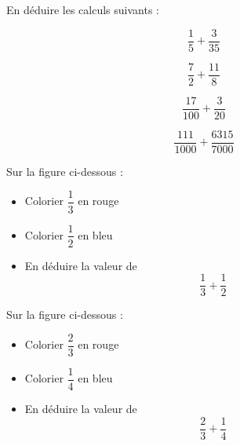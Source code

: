 En déduire les calculs suivants :

\begin{multicols}{4}
    $$\dfrac{1}{5}+\dfrac{3}{35}$$

    $$\dfrac{7}{2}+\dfrac{11}{8}$$

    $$\dfrac{17}{100}+\dfrac{3}{20}$$

    $$\dfrac{111}{1000}+\dfrac{6315}{7000}$$
\end{multicols}

\newpage


\begin{minipage}[t]{0.3\textwidth}
    Sur la figure ci-dessous :
    \begin{itemize}
        \item Colorier $\dfrac{1}{3}$ en rouge
        \item Colorier $\dfrac{1}{2}$ en bleu
        \item En déduire la valeur de $$\dfrac{1}{3}+\dfrac{1}{2}$$
    \end{itemize}
    \begin{figure}[H]
        \center
    \end{figure}
\end{minipage}
\hfil
\vrule
\hfil
\begin{minipage}[t]{0.3\textwidth}
    Sur la figure ci-dessous :
    \begin{itemize}
        \item Colorier $\dfrac{2}{3}$ en rouge
        \item Colorier $\dfrac{1}{4}$ en bleu
        \item En déduire la valeur de $$\dfrac{2}{3}+\dfrac{1}{4}$$
    \end{itemize}
    \begin{figure}[H]
        \center
    \end{figure}
\end{minipage}
\hfil
\vrule
\hfil

